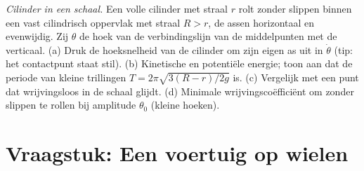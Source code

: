 \begin{exercise}[$\star\star\star$]\label{exo:b2:rigid-body-mechanics:12}
\emph{Cilinder in een schaal.} Een volle cilinder met straal $r$ rolt
zonder slippen binnen een vast cilindrisch oppervlak met straal $R > r$,
de assen horizontaal en evenwijdig. Zij $\theta$ de hoek van de
verbindingslijn van de middelpunten met de verticaal. (a) Druk de
hoeksnelheid van de cilinder om zijn eigen as uit in $\dot\theta$ (tip:
het contactpunt staat stil). (b) Kinetische en potentiële energie; toon
aan dat de periode van kleine trillingen $T = 2\pi\sqrt{3(R - r)/2g}$ is.
(c) Vergelijk met een punt dat wrijvingsloos in de schaal glijdt.
(d) Minimale wrijvingscoëfficiënt om zonder slippen te rollen bij
amplitude $\theta_0$ (kleine hoeken).
\end{exercise}

\section{Vraagstuk: Een voertuig op wielen}

